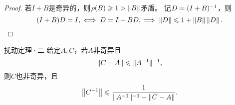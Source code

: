 \begin{proof}
    若$I+B$是奇异的，则$\rho(B)\geqslant 1>\left\lVert B\right\rVert$矛盾。
    记$D=(I+B)^{-1}$，则 
    \[
        (I+B)D=I,\iff D=I-BD,\implies \left\lVert D\right\rVert\leqslant 1+\left\lVert B\right\rVert\left\lVert D\right\rVert.
        \qedhere
    \]
\end{proof}

\begin{theorem}
    {扰动定理·二}{}
    给定$A,C$，若$A$非奇异且
    \[
        \left\lVert C-A\right\rVert\leqslant\lVert A^{-1}\rVert^{-1},
    \]
    则$C$也非奇异，且
    \begin{equation}
        \left\lVert C^{-1}\right\rVert\leqslant\frac{1}{\lVert A^{-1}\rVert^{-1}-\left\lVert C-A\right\rVert}.
    \end{equation}
\end{theorem}



